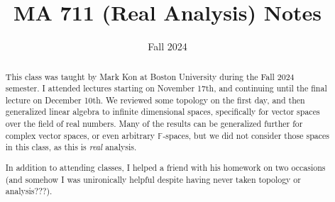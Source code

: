 \documentclass[11pt, letterpaper]{report}
\title{MA 711 (Real Analysis) Notes}
\date{Fall 2024}
\begin{document}
\maketitle
\begin{abstract}
	This class was taught by Mark Kon at Boston University during the Fall 2024 semester. I attended lectures starting on November 17th, and continuing until the final lecture on December 10th. We reviewed some topology on the first day, and then generalized linear algebra to infinite dimensional spaces, specifically for vector spaces over the field of real numbers. Many of the results can be generalized further for complex vector spaces, or even arbitrary $\mathbb{F}$-spaces, but we did not consider those spaces in this class, as this is \emph{real} analysis.

	In addition to attending classes, I helped a friend with his homework on two occasions (and somehow I was unironically helpful despite having never taken topology or analysis???).
\end{abstract}
\setcounter{page}{0}
\tableofcontents
\end{document}
